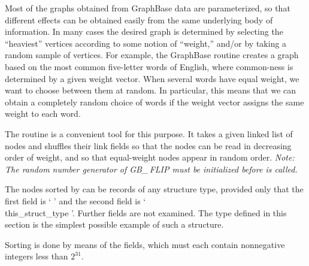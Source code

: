 Most of the graphs obtained from GraphBase data are parameterized,
so that different effects can be obtained easily from the same
underlying body of information. In many cases the desired graph
is determined by selecting the ``heaviest'' vertices according to some
notion of ``weight,'' and/or by taking a random sample of vertices. For
example, the GraphBase routine  creates
a graph based on the  most common five-letter words of English, where
common-ness is determined by a given weight vector. When several words have
equal weight, we want to choose between them at random. In particular, this
means that we can obtain a completely random choice of words if the weight
vector assigns the same weight to each word.

The  routine is a convenient tool for this purpose. It
takes a
given linked list of nodes and shuffles their link fields so that the
nodes can be read in decreasing order of weight, and so that equal-weight
nodes appear in random order. {\sl Note: The random number generator of
{\sc GB\_\,FLIP} must be initialized before  is called.}

The nodes sorted by  can be records of any structure type,
provided only that the first field is ` ' and the
second field
is ` \\{this\_struct\_type} '. Further fields
are not
examined. The  type defined in this section is the simplest
possible
example of such a structure.

Sorting is done by means of the  fields, which must each contain
nonnegative integers less than $2^{31}$.

